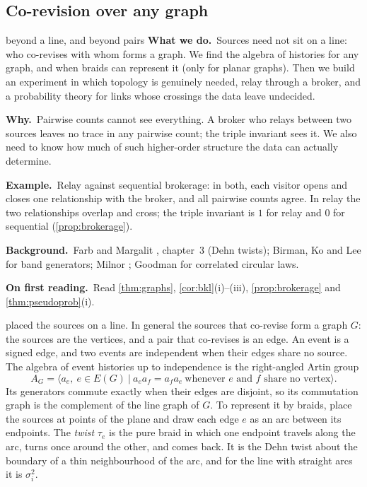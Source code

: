 \documentclass[11pt]{article}
\theoremstyle{definition}\newtheorem{definition}[theorem]{Definition}\newtheorem{remark}[theorem]{Remark}\newtheorem{example}[theorem]{Example}\newtheorem{problem}[theorem]{Open problem}\crefname{problem}{Problem}{Problems}
\newcommand{\rbwhat}{\textcolor{rbWhat}{\textbf{What we do.}}~}\newcommand{\rbwhy}{\par\smallskip\textcolor{rbWhy}{\textbf{Why.}}~}
\newcommand{\rbex}{\par\smallskip\textcolor{rbEx}{\textbf{Example.}}~}\newcommand{\rbbg}{\par\smallskip\textcolor{rbBg}{\textbf{Background.}}~}
\newcommand{\rbfirst}{\par\smallskip\textcolor{rbFirst}{\textbf{On first reading.}}~}
\begin{document}
\subsection{Co-revision over any graph}\label{sec:graphs}
\begin{readerbox}{beyond a line, and beyond pairs}
\rbwhat Sources need not sit on a line: who co-revises with whom forms a graph. We find the algebra of histories for any graph, and when braids can represent it (only for planar graphs). Then we build an experiment in which topology is genuinely needed, relay through a broker, and a probability theory for links whose crossings the data leave undecided.
\rbwhy Pairwise counts cannot see everything. A broker who relays between two sources leaves no trace in any pairwise count; the triple invariant sees it. We also need to know how much of such higher-order structure the data can actually determine.
\rbex Relay against sequential brokerage: in both, each visitor opens and closes one relationship with the broker, and all pairwise counts agree. In relay the two relationships overlap and cross; the triple invariant is $1$ for relay and $0$ for sequential (\cref{prop:brokerage}).
\rbbg Farb and Margalit \cite{FarbMargalit2012}, chapter~3 (Dehn twists); Birman, Ko and Lee \cite{BirmanKoLee1998} for band generators; Milnor \cite{Milnor1954}; Goodman \cite{Goodman1985} for correlated circular laws.
\rbfirst Read \cref{thm:graphs}, \cref{cor:bkl}(i)--(iii), \cref{prop:brokerage} and \cref{thm:pseudoprob}(i).
\end{readerbox}
 placed the sources on a line. In general the sources that co-revise form a graph $G$: the sources are the vertices, and a pair that co-revises is an edge. An event is a signed edge, and two events are independent when their edges share no source. The algebra of event histories up to independence is the right-angled Artin group
\[
A_G=\big\langle a_e,\ e\in E(G)\ \big|\ a_ea_f=a_fa_e\ \text{whenever $e$ and $f$ share no vertex}\big\rangle .
\]
Its generators commute exactly when their edges are disjoint, so its commutation graph is the complement of the line graph of $G$. To represent it by braids, place the sources at points of the plane and draw each edge $e$ as an arc between its endpoints. The \emph{twist} $\tau_e$ is the pure braid in which one endpoint travels along the arc, turns once around the other, and comes back. It is the Dehn twist about the boundary of a thin neighbourhood of the arc, and for the line with straight arcs it is $\sigma_i^2$.
\end{document}
